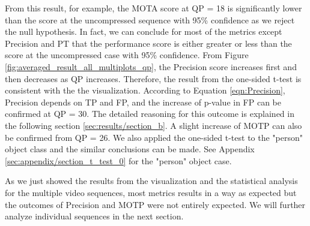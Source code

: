 
From this result, for example, the MOTA score at QP = 18 is significantly lower than the score at the uncompressed sequence with 95\% confidence as we reject the null hypothesis. In fact, we can conclude for most of the metrics except Precision and PT that the performance score is either greater or less than the score at the uncompressed case with 95\% confidence. From Figure \ref{fig:averaged_result_all_multiplots_qp}, the Precision score increases first and then decreases as QP increases. Therefore, the result from the one-sided t-test is consistent with the the visualization. According to Equation \ref{eqn:Precision}, Precision depends on TP and FP, and the increase of p-value in FP can be confirmed at QP = 30. The detailed reasoning for this outcome is explained in the following section \ref{sec:results/section_b}. A slight increase of MOTP can also be confirmed from QP = 26. We also applied the one-sided t-test to the "person" object class and the similar conclusions can be made. See Appendix \ref{sec:appendix/section_t_test_0} for the "person" object case.

As we just showed the results from the visualization and the statistical analysis for the multiple video sequences, most metrics results in a way as expected but the outcomes of Precision and MOTP were not entirely expected. We will further analyze individual sequences in the next section.


